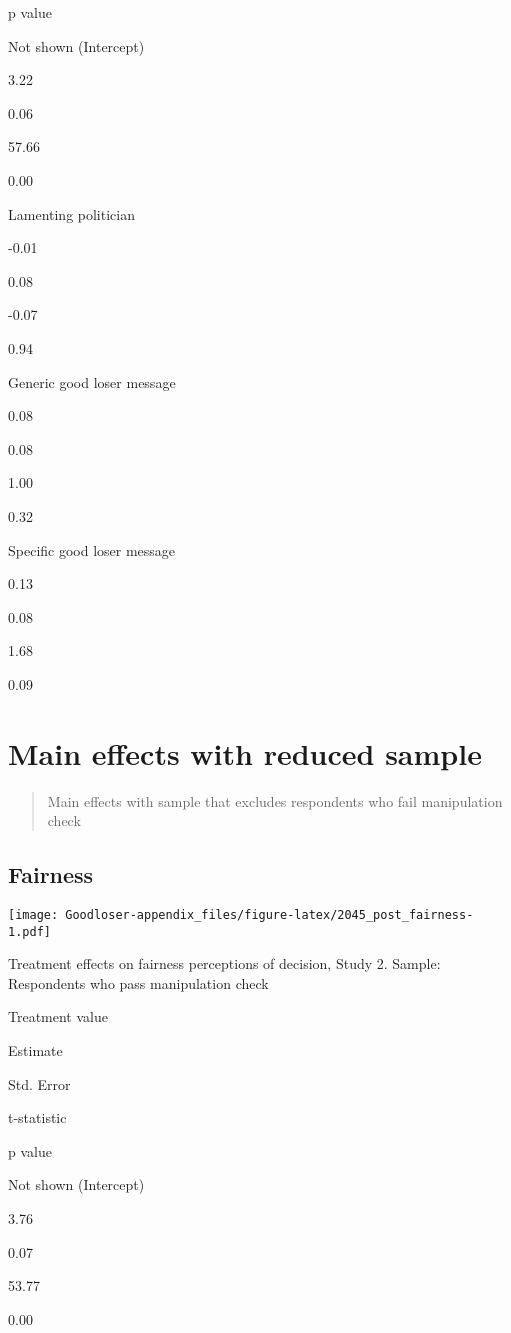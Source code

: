 \documentclass[
]{book}
\begin{document}
p value

Not shown (Intercept)

3.22

0.06

57.66

0.00

Lamenting politician

-0.01

0.08

-0.07

0.94

Generic good loser message

0.08

0.08

1.00

0.32

Specific good loser message

0.13

0.08

1.68

0.09

\hypertarget{reduced-sample}{%
\section{Main effects with reduced sample}\label{reduced-sample}}

\begin{quote}
Main effects with sample that excludes respondents who fail manipulation
check
\end{quote}

\hypertarget{fairness-4}{%
\subsection{Fairness}\label{fairness-4}}

\texttt{[image: Goodloser-appendix\_files/figure-latex/2045\_post\_fairness-1.pdf]}

Treatment effects on fairness perceptions of decision, Study 2. Sample:
Respondents who pass manipulation check

Treatment value

Estimate

Std. Error

t-statistic

p value

Not shown (Intercept)

3.76

0.07

53.77

0.00
\end{document}
